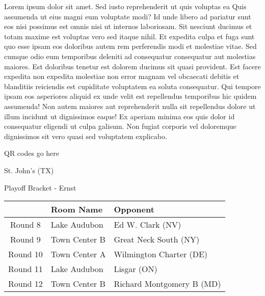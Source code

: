 \documentclass{article}%
\begin{document}
\vspace*{8pt}%
\linebreak%
\newline%
\newline%
Lorem ipsum dolor sit amet. Sed iusto reprehenderit ut quis voluptas ea Quis assumenda ut eius magni eum voluptate modi? Id unde libero ad pariatur sunt eos nisi possimus est omnis nisi ut internos laboriosam. Sit nesciunt ducimus et totam maxime est voluptas vero sed itaque nihil. Et expedita culpa et fuga sunt quo esse ipsam eos doloribus autem rem perferendis modi et molestiae vitae.\newline%
\newline%
Sed cumque odio eum temporibus deleniti ad consequatur consequatur aut molestias maiores. Est doloribus tenetur est dolorem ducimus sit quasi provident. Est facere expedita non expedita molestiae non error magnam vel obcaecati debitis et blanditiis reiciendis est cupiditate voluptatem ea soluta consequatur. Qui tempore ipsam eos asperiores aliquid ex unde velit est repellendus temporibus hic quidem assumenda!\newline%
\newline%
Non autem maiores aut reprehenderit nulla sit repellendus dolore ut illum incidunt ut dignissimos eaque! Ex aperiam minima eos quis dolor id consequatur eligendi ut culpa galisum. Non fugiat corporis vel doloremque dignissimos sit vero quasi sed voluptatem explicabo.\newline%
\newline%
%
\vspace*{30pt}%
\begin{center}%
\begin{Huge}%
QR codes go here%
\end{Huge}%
\end{center}%
\newpage%
\begin{center}%
\begin{Huge}%
St. John's (TX)%
\end{Huge}%
\vspace*{8pt}%
\linebreak%
\begin{Large}%
Playoff Bracket {-} Ernst%
\end{Large}%
\end{center}%
%
\begin{tabularx}{\textwidth}{|c|Y|Y|}%
\hline%
&Room Name&Opponent\\%
\hline%
Round 8&Lake Audubon&Ed W. Clark (NV)\\%
Round 9&Town Center B&Great Neck South (NY)\\%
Round 10&Town Center A&Wilmington Charter (DE)\\%
Round 11&Lake Audubon&Lisgar (ON)\\%
Round 12&Town Center B&Richard Montgomery B (MD)\\%
\hline%
\end{tabularx}%
\end{document}
